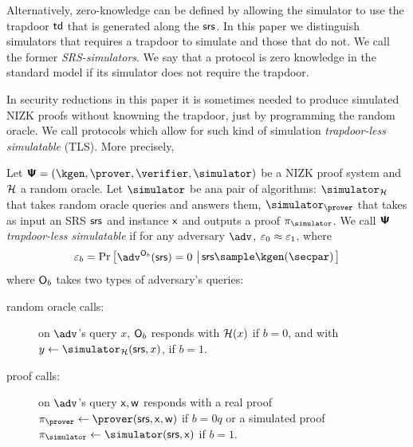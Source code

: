\documentclass[runningheads,11pt]{llncs}
\begin{document}
Alternatively, zero-knowledge can be defined by allowing the simulator to use
the trapdoor $\mathsf{td}$ that is generated along the $\mathsf{srs}$. In this paper we distinguish
simulators that requires a trapdoor to simulate and those that do not. We call
the former \emph{SRS-simulators}. We say that a protocol is zero knowledge in
the standard model if its simulator does not require the trapdoor.


In security reductions in this paper it is sometimes needed to produce
simulated NIZK proofs without knowning the trapdoor, just by
programming the random oracle. We call protocols which allow for such kind of
simulation \emph{trapdoor-less simulatable} (TLS). More precisely,

\begin{definition}
  Let $\ps = (\kgen, \prover, \verifier, \simulator)$ be a NIZK proof
  system and $\mathcal{H}$ a random oracle. Let $\simulator$ be ana pair of
  algorithms: $\simulator_\ro$ that takes random oracle queries and
  answers them, $\simulator_\prover$ that takes as input an SRS $\mathsf{srs}$
  and instance $\mathsf{x}$ and outputs a proof $\zkproof_\simulator$.  We
  call $\bm{\mathsf{\Psi}}$ \emph{trapdoor-less simulatable} if for any adversary
  $\adv$, $\varepsilon_0 \approx \varepsilon_1$, where
  \begin{align}
    \eps_b = \Pr\left[
    \begin{aligned}
      \adv^{\oracleo_b}(\srs) = 0
    \end{aligned}
    \, \left| \,
    \begin{aligned}
      \srs \sample \kgen(\secpar)
    \end{aligned}
    \right.\right]
  \end{align}
  where $\mathsf{O}_b$ takes two types of adversary's queries:
  \begin{description}
  \item[random oracle calls:] on $\adv$'s query $x$, $\mathsf{O}_b$
    responds with $\mathcal{H}(x)$ if $b = 0$, and with $y \gets
    \simulator_\ro(\srs, x)$, if $b = 1$.
  \item[proof calls:] on $\adv$'s query $\mathsf{x}, \mathsf{w}$ responds
  with a real proof $\zkproof_\prover \gets
  \prover(\srs, \inp, \wit)$ if $b = 0q$ or a simulated proof $\zkproof_\simulator \gets \simulator (\srs,
  \inp)$ if $b = 1$. 
  \end{description} 
\end{definition}
\end{document}
